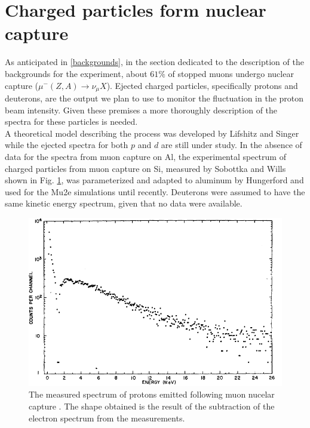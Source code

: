 \documentclass[12pt,a4paper,openright, oneside, titlepage]{book} %
\begin{document}
\section{Charged particles form nuclear capture}
As anticipated in \ref{backgrounds}, in the section dedicated to the description of the backgrounds for the experiment, about $61\%$ of stopped muons undergo nuclear capture ($\mu^-(Z,A)\rightarrow \nu_\mu X$). 
Ejected charged particles, specifically protons and deuterons, are the output we plan to use to monitor the fluctuation in the proton beam intensity. 
Given these premises a more thoroughly description of the spectra for these particles is needed.\\
A theoretical model describing the process was developed by Lifshitz and Singer \cite{Lifshitz} while the ejected spectra for both $p$ and $d$ are still under study. 
In the absence of data for the spectra from muon capture on Al, the experimental spectrum of charged particles from muon capture on Si, measured by Sobottka and Wills \cite{Sobottka} shown in Fig. \ref{_sobottka}, was parameterized and adapted to aluminum by Hungerford \cite{Hungerford} and used for the Mu2e simulations until recently. 
Deuterons were assumed to have the same kinetic energy spectrum, given that no data were available.\\

\begin{figure}
\centering
\includegraphics[scale=0.8]{sobottka}
\caption{The measured spectrum of protons emitted following muon nucelar capture \cite{Sobottka}. The shape obtained is the result of the subtraction of the electron spectrum from the measurements.}
\label{_sobottka}
\end{figure}
\end{document}

